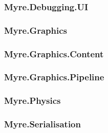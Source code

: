 \documentclass{article}
\begin{document}
\subsubsection{Myre.Debugging.UI}
\subsubsection{Myre.Graphics}
\subsubsection{Myre.Graphics.Content}
\subsubsection{Myre.Graphics.Pipeline}
\subsubsection{Myre.Physics}
\subsubsection{Myre.Serialisation}
\end{document}
